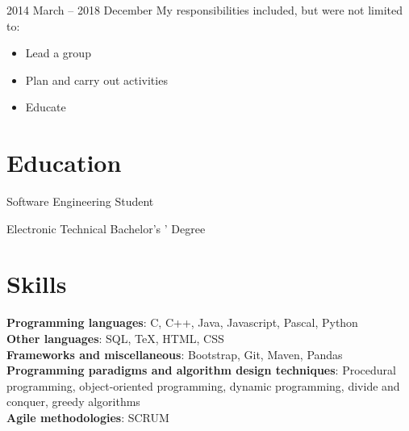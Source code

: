 \documentclass{resume}
\begin{document}
 {2014 March -- 2018 December}
My responsibilities included, but were not limited to:
\begin{itemize}
    \item Lead a group
    \item Plan and carry out activities
    \item Educate
\end{itemize}

\section{Education}

Software Engineering Student

Electronic Technical Bachelor's ’ Degree

\section{Skills}
\smallskip
\textbf{Programming languages}: C, C++, Java, Javascript, Pascal, Python \\
\textbf{Other languages}: SQL, TeX, HTML, CSS \\
\textbf{Frameworks and miscellaneous}: Bootstrap, Git, Maven, Pandas \\
\textbf{Programming paradigms and algorithm design techniques}: Procedural programming, object-oriented programming, dynamic programming, divide and conquer, greedy algorithms \\
\textbf{Agile methodologies}: SCRUM \\
\end{document}

